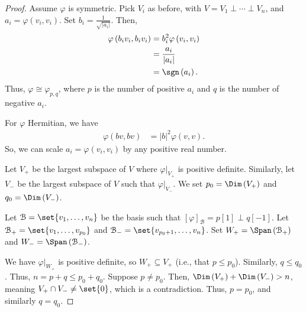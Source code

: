\documentclass[10pt]{mypackage}
\begin{document}
  \begin{proof}
    Assume $\varphi$ is symmetric. Pick $V_i$ as before, with $V = V_1\perp\cdots\perp V_n$, and $a_i = \varphi\left(v_i,v_i\right)$. Set $b_i = \frac{1}{\sqrt{\left\vert a_i \right\vert}}$. Then,
    \begin{align*}
      \varphi\left(b_iv_i,b_iv_i\right) &= b_i^2\varphi\left(v_i,v_i\right)\\
                                        &= \frac{a_i}{\left\vert a_i \right\vert}\\
                                        &= \sgn\left(a_i\right).
    \end{align*}
    Thus, $\varphi\cong \varphi_{p,q}$, where $p$ is the number of positive $a_i$ and $q$ is the number of negative $a_i$.\newline

    For $\varphi$ Hermitian, we have
    \begin{align*}
      \varphi\left(bv,bv\right) &= \left\vert b \right\vert^2 \varphi\left(v,v\right).
    \end{align*}
    So, we can scale $a_i = \varphi\left(v_i,v_i\right)$ by any positive real number.\newline

  Let $V_{+}$ be the largest subspace of $V$ where $\varphi|_{V_+}$ is positive definite. Similarly, let $V_{-}$ be the largest subspace of $V$ such that $\varphi|_{V_-}$. We set $p_0 = \Dim\left(V_{+}\right)$ and $q_0 = \Dim\left(V_{-}\right)$.\newline

  Let $\mathcal{B} = \set{v_1,\dots,v_n}$ be the basis such that $\left[\varphi\right]_{\mathcal{B}}=p[1] \perp q[-1]$. Let $\mathcal{B}_{+} = \set{v_1,\dots,v_{p_0}}$ and $\mathcal{B}_{-} = \set{v_{p_0 + 1},\dots,v_{n}}$. Set $W_{+} = \Span\left(\mathcal{B}_{+}\right)$ and $W_{-} = \Span\left(\mathcal{B}_{-}\right)$.\newline

  We have $\varphi|_{W_{+}}$ is positive definite, so $W_{+}\subseteq V_{+}$ (i.e., that $p \leq p_0$). Similarly, $q \leq q_0$. Thus, $n = p + q \leq p_0 + q_0$. Suppose $p\neq p_0$. Then, $\Dim\left(V_+\right) + \Dim\left(V_{-}\right) > n$, meaning $V_{+}\cap V_{-} \neq \set{0}$, which is a contradiction. Thus, $p = p_0$, and similarly $q = q_0$.
  \end{proof}
\end{document}
